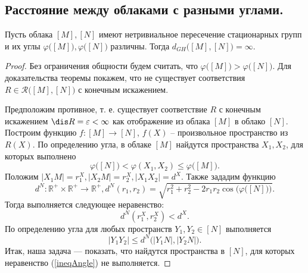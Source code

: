 \subsection{Расстояние между облаками с разными углами.}
\begin{theorem}
  \label{thm:diffAndDist}
  Пусть облака \( [M], [N] \) имеют нетривиальное пересечение
  стационарных групп и их углы \( \varphi \big([M]\big), \varphi
  \big([N]\big) \) различны. Тогда \( d_{GH} \big([M], [N]\big) =
  \infty \).
\end{theorem}
\begin{proof}
  Без ограничения общности будем считать, что \( \varphi \big([M]\big)>
  \varphi \big([N]\big) \). Для доказательства теоремы покажем, что не
  существует соответствия \( R\in \mathcal{R}\big([M],[N]\big) \) с
  конечным искажением.

  Предположим противное, т. е. существует соответствие \( R \) с
  конечным искажением \( \dis R = \varepsilon < \infty \) как
  отображение из облака \( [M] \) в облако \( [N] \). Построим функцию
  \( f \colon [M] \rightarrow [N] \), \( f(X) \) -- произвольное
  пространство из \(
    R(X)
  \). По определению угла, в облаке \( [M] \) найдутся пространства \(
  X_1, X_2 \), для которых выполнено
  \[
    \varphi \big([N]\big) < \varphi (X_1, X_2) \le \varphi
  \big([M]\big). \]
  Положим \( |X_1 M| = r_1^X,  |X_2 M| = r_2^X, | X_1 X_2 | = d^X\).
  Также зададим функцию
  \[ d^N \colon \mathbb{R}^+ \times \mathbb{R}^+ \rightarrow
    \mathbb{R}^+, d^N(r_1, r_2) =
    \sqrt{r_1^2 + r_2^2 - 2r_1r_2\cos\Big(\varphi \big([N]\big)\Big)}.
  \]
  Тогда выполняется следующее неравенство:
  \begin{equation}
    d^N(r_1^X, r_2^X) < d^X.
    \label{ineqdx}
  \end{equation}
  По определению угла для любых пространств \( Y_1, Y_2 \in [N] \)
  выполняется
  \begin{equation}
    | Y_1 Y_2 | \le d^N\big(| Y_1N |, | Y_2N |\big). \label{ineqAngle}
  \end{equation}
  Итак, наша задача --- показать, что найдутся пространства в \( [N]
  \), для которых неравенство (\ref{ineqAngle}) не выполняется.


\end{proof}
